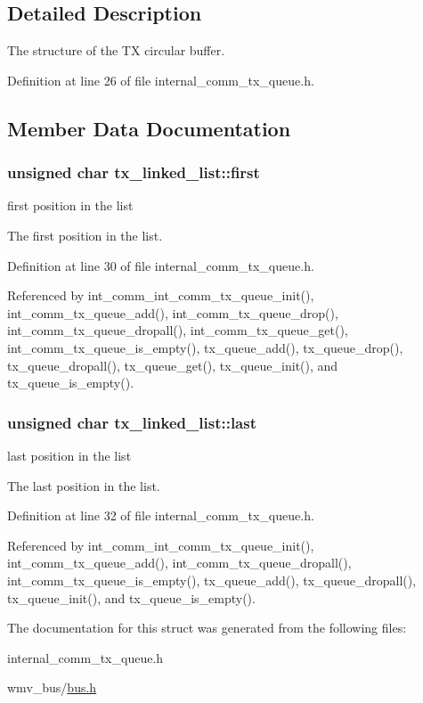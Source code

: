 \subsection{Detailed Description}
The structure of the TX circular buffer. 

Definition at line 26 of file internal\_\-comm\_\-tx\_\-queue.h.

\subsection{Member Data Documentation}
\hypertarget{structtx__linked__list_953e1b569a24b8d898896ef81b47499d}{
\subsubsection[{first}]{\setlength{\rightskip}{0pt plus 5cm}unsigned char {\bf tx\_\-linked\_\-list::first}}}
\label{structtx__linked__list_953e1b569a24b8d898896ef81b47499d}


first position in the list 

The first position in the list. 

Definition at line 30 of file internal\_\-comm\_\-tx\_\-queue.h.

Referenced by int\_\-comm\_\-int\_\-comm\_\-tx\_\-queue\_\-init(), int\_\-comm\_\-tx\_\-queue\_\-add(), int\_\-comm\_\-tx\_\-queue\_\-drop(), int\_\-comm\_\-tx\_\-queue\_\-dropall(), int\_\-comm\_\-tx\_\-queue\_\-get(), int\_\-comm\_\-tx\_\-queue\_\-is\_\-empty(), tx\_\-queue\_\-add(), tx\_\-queue\_\-drop(), tx\_\-queue\_\-dropall(), tx\_\-queue\_\-get(), tx\_\-queue\_\-init(), and tx\_\-queue\_\-is\_\-empty().\hypertarget{structtx__linked__list_7d2794d33345fb0d994a0a2556d72b73}{
\subsubsection[{last}]{\setlength{\rightskip}{0pt plus 5cm}unsigned char {\bf tx\_\-linked\_\-list::last}}}
\label{structtx__linked__list_7d2794d33345fb0d994a0a2556d72b73}


last position in the list 

The last position in the list. 

Definition at line 32 of file internal\_\-comm\_\-tx\_\-queue.h.

Referenced by int\_\-comm\_\-int\_\-comm\_\-tx\_\-queue\_\-init(), int\_\-comm\_\-tx\_\-queue\_\-add(), int\_\-comm\_\-tx\_\-queue\_\-dropall(), int\_\-comm\_\-tx\_\-queue\_\-is\_\-empty(), tx\_\-queue\_\-add(), tx\_\-queue\_\-dropall(), tx\_\-queue\_\-init(), and tx\_\-queue\_\-is\_\-empty().

The documentation for this struct was generated from the following files:\begin{CompactItemize}
\item 
internal\_\-comm\_\-tx\_\-queue.h\item 
wmv\_\-bus/\hyperlink{bus_8h}{bus.h}\end{CompactItemize}
